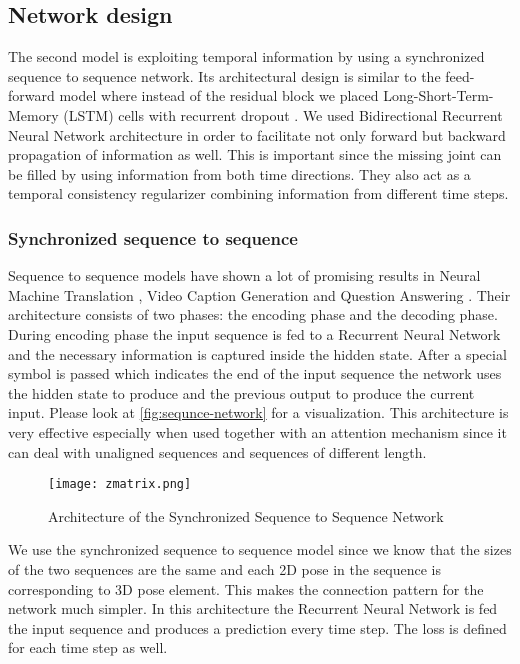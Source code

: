 \subsection{Network design}

The second model is exploiting temporal information by using a synchronized sequence to sequence network. Its architectural design is similar to the feed-forward model where instead of the residual block we placed Long-Short-Term-Memory (LSTM) \parencite{hochreiter1997long} cells with recurrent dropout \parencite{semeniuta2016recurrent}. We used Bidirectional Recurrent Neural Network \parencite{schuster1997bidirectional} architecture in order to facilitate not only forward but backward propagation of information as well. This is important since the missing joint can be filled by using 
information from both time directions. They also act as a temporal consistency regularizer combining information from different time steps.

\subsubsection{Synchronized sequence to sequence}

Sequence to sequence models \parencite{sutskever2014sequence} have shown a lot of promising results in Neural Machine Translation \parencite{bahdanau2014neural}, Video Caption Generation \parencite{xu2015show} and Question Answering \parencite{hermann2015teaching}. Their architecture consists of two phases: the encoding phase and the decoding phase. During encoding phase the input sequence is fed to a Recurrent Neural Network and the necessary information is captured inside the hidden state. After a special  symbol is passed which indicates the end of the input sequence the network uses the hidden state to produce and the previous output to produce the current input. Please look at \autoref{fig:sequnce-network} for a visualization. This architecture is very effective especially when used together with an attention mechanism since it can deal with unaligned sequences and sequences of different length.

\begin{figure}[htpb]
    \texttt{[image: zmatrix.png]}
    \caption{Architecture of the Synchronized Sequence to Sequence Network}
    \label{fig:sequnce-network}
\end{figure}

We use the synchronized sequence to sequence model since we know that the sizes of the two sequences are the same and each 2D pose in the sequence is corresponding to 3D pose element. This makes the connection pattern for the network much simpler. In this architecture the Recurrent Neural Network is fed the input sequence and produces a prediction every time step. The loss is defined for each time step as well.

